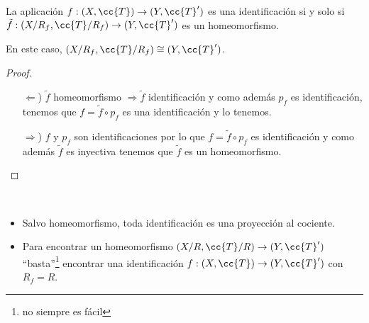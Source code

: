 \begin{prop}
    La aplicación $f:(X,\cc{T}) \to (Y, \cc{T}')$ es una identificación si y solo si $\tilde{f}:(X/R_f, \cc{T}/R_f)\to (Y, \cc{T}')$ es un homeomorfismo.

    \begin{figure}[H]
        \centering
    \end{figure}

    En este caso, $(X/R_f, \cc{T}/R_f)\cong (Y, \cc{T}')$.
    \begin{proof}\
        \begin{itemize}
            \item[$\Leftarrow$)] $\tilde{f}$ homeomorfismo $\Rightarrow \tilde{f}$ identificación y como además $p_f$ es identificación, tenemos que $f=\tilde{f}\circ p_f$ es una identificación y lo tenemos.
            \item[$\Rightarrow$)] $f$ y $p_f$ son identificaciones por lo que $f=\tilde{f}\circ p_f$ es identificación y como además $\tilde{f}$ es inyectiva tenemos que $\tilde{f}$ es un homeomorfismo.
        \end{itemize}
    \end{proof}
\end{prop}

\begin{observacion}\
    \begin{itemize}
        \item Salvo homeomorfismo, toda identificación es una proyección al cociente.
        \item Para encontrar un homeomorfismo $(X/R, \cc{T}/R)\to (Y, \cc{T}')$ ``basta''\footnote{no siempre es fácil} encontrar una identificación $f:(X,\cc{T})\to (Y, \cc{T}')$ con $R_f=R$.
    \end{itemize}
    \endsquare
\end{observacion}

